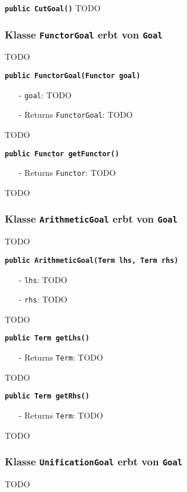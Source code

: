 \documentclass[parskip=full,11pt,twoside]{scrartcl}
\begin{document}
\textbf{\texttt{public CutGoal()}}
TODO

\subsubsection{Klasse \texttt{FunctorGoal} erbt von \texttt{Goal}}
TODO

\textbf{\texttt{public FunctorGoal(Functor goal)}}
\begin{itemize}[noitemsep]
	\item[-] \texttt{goal}: TODO
	\item[-] Returns \texttt{FunctorGoal}: TODO
\end{itemize}
TODO

\textbf{\texttt{public Functor getFunctor()}}
\begin{itemize}[noitemsep]
	\item[-] Returns \texttt{Functor}: TODO
\end{itemize}
TODO

\subsubsection{Klasse \texttt{ArithmeticGoal} erbt von \texttt{Goal}}
TODO

\textbf{\texttt{public ArithmeticGoal(Term lhs, Term rhs)}}
\begin{itemize}[noitemsep]
	\item[-] \texttt{lhs}: TODO
	\item[-] \texttt{rhs}: TODO
\end{itemize}
TODO

\textbf{\texttt{public Term getLhs()}}
\begin{itemize}[noitemsep]
	\item[-] Returns \texttt{Term}: TODO
\end{itemize}
TODO

\textbf{\texttt{public Term getRhs()}}
\begin{itemize}[noitemsep]
	\item[-] Returns \texttt{Term}: TODO
\end{itemize}
TODO

\subsubsection{Klasse \texttt{UnificationGoal} erbt von \texttt{Goal}}
TODO
\end{document}
